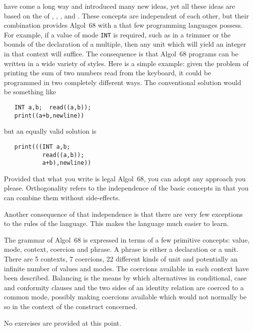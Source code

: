  have come a long way and introduced many new
ideas, yet all these ideas are based on the 
of , , ,  and
.  These concepts are independent of each other, but their
combination provides Algol~68 with a  that few
programming languages possess.  For example, if a value of mode
\verb|INT| is required, such as in a trimmer or the bounds of the
declaration of a multiple, then any unit which will yield an integer
in that context will suffice.  The consequence is that Algol~68
programs can be written in a wide variety of styles.  Here is a
simple example: given the problem of printing the sum of two numbers
read from the keyboard, it could be programmed in two completely
different ways.  The conventional solution would be something like
\begin{verbatim}
   INT a,b;  read((a,b));
   print((a+b,newline))
\end{verbatim}
\noindent
but an equally valid solution is
\begin{verbatim}
   print(((INT a,b;
           read((a,b));
           a+b),newline))
\end{verbatim}
\noindent
Provided that what you write is legal Algol~68, you can adopt any
approach you please. Orthogonality refers to the independence of the
basic concepts in that you can combine them without side-effects.

Another consequence of that independence is that there are very few
exceptions to the rules of the language.  This makes the language
much easier to learn.

The grammar of Algol~68 is expressed in terms of a few primitive
concepts: value, mode, context, coercion and phrase. A phrase is
either a declaration or a unit. There are 5 contexts, 7 coercions, 22
different kinds of unit and potentially an infinite number of values
and modes.  The coercions available in each context have been
described.  Balancing is the means by which alternatives in
conditional, case and conformity clauses and the two sides of an
identity relation are coerced to a common mode, possibly making
coercions available which would not normally be so in the context of
the construct concerned.

No exercises are provided at this point.
